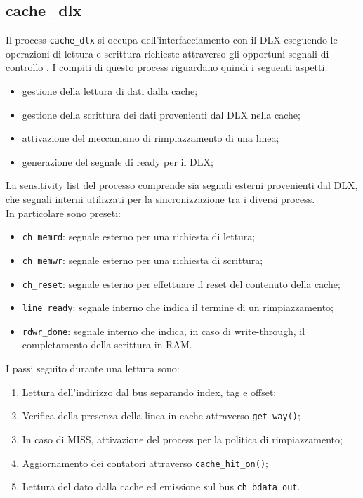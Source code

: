 \subsection{cache\_dlx}

Il process \texttt{cache\_dlx} si occupa dell'interfacciamento con il DLX eseguendo le operazioni di lettura e scrittura richieste attraverso gli opportuni segnali di controllo .
I compiti di questo process riguardano quindi i seguenti aspetti:
\begin{itemize}
  \item gestione della lettura di dati dalla cache;
  \item gestione della scrittura dei dati provenienti dal DLX nella cache;
  \item attivazione del meccanismo di rimpiazzamento di una linea;
  \item generazione del segnale di ready per il DLX;
\end{itemize}

La sensitivity list del processo comprende sia segnali esterni provenienti dal DLX, che segnali interni utilizzati per la sincronizzazione tra i diversi process.\\
In particolare sono preseti:
\begin{itemize}
  \item \texttt{ch\_memrd}: segnale esterno per una richiesta di lettura;
  \item \texttt{ch\_memwr}: segnale esterno per una richiesta di scrittura;
  \item \texttt{ch\_reset}: segnale esterno per effettuare il reset del contenuto della cache;
  \item \texttt{line\_ready}: segnale interno che indica il termine di un rimpiazzamento;
  \item \texttt{rdwr\_done}: segnale interno che indica, in caso di write-through, il completamento della scrittura in RAM.
\end{itemize}
 
I passi seguito durante una lettura sono:
\begin{enumerate}
  \item Lettura dell'indirizzo dal bus separando index, tag e offset;
  \item Verifica della presenza della linea in cache attraverso \texttt{get\_way()};
  \item In caso di MISS, attivazione del process per la politica di rimpiazzamento;
  \item Aggiornamento dei contatori attraverso \texttt{cache\_hit\_on()};
  \item Lettura del dato dalla cache ed emissione sul bus \texttt{ch\_bdata\_out}.
\end{enumerate}	

